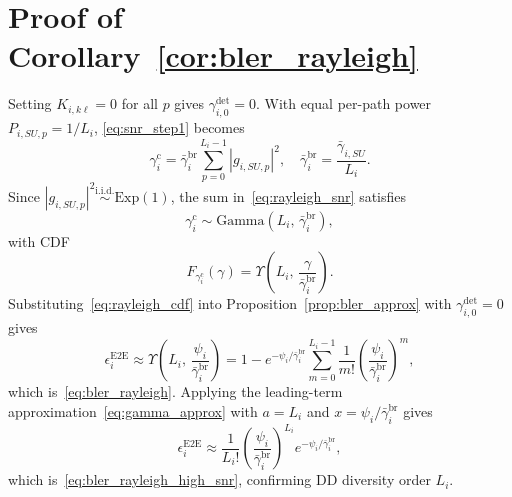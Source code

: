 \documentclass[lettersize,journal]{IEEEtran}
\begin{document}
\section{Proof of Corollary~\ref{cor:bler_rayleigh}}
\label{app:proof_bler_rayleigh}
Setting $K_{i,k\ell}=0$ for all $p$ gives $\gamma_{i,0}^{\mathrm{det}}=0$. With equal per-path power $P_{i,SU,p}=1/L_i$, \eqref{eq:snr_step1} becomes
\begin{equation}
\gamma_i^{\mathrm{c}}=\bar{\gamma}_{i}^{\mathrm{br}}\sum_{p=0}^{L_i-1}|g_{i,SU,p}|^2,\quad\bar{\gamma}_{i}^{\mathrm{br}}=\frac{\bar{\gamma}_{i,SU}}{L_i}.
\label{eq:rayleigh_snr}
\end{equation}
Since $|g_{i,SU,p}|^2\overset{\mathrm{i.i.d.}}{\sim}\mathrm{Exp}(1)$, the sum in~\eqref{eq:rayleigh_snr} satisfies
\begin{equation}
\gamma_i^{\mathrm{c}}\sim\mathrm{Gamma}\!\left(L_i,\,\bar{\gamma}_{i}^{\mathrm{br}}\right),
\end{equation}
with CDF
\begin{equation}
F_{\gamma_i^{\mathrm{c}}}(\gamma)=\Upsilon\!\left(L_i,\,\frac{\gamma}{\bar{\gamma}_{i}^{\mathrm{br}}}\right).
\label{eq:rayleigh_cdf}
\end{equation}
Substituting~\eqref{eq:rayleigh_cdf} into Proposition~\ref{prop:bler_approx} with $\gamma_{i,0}^{\mathrm{det}}=0$ gives
\begin{equation}
\epsilon_i^{\mathrm{E2E}}\approx\Upsilon\!\left(L_i,\,\frac{\psi_i}{\bar{\gamma}_{i}^{\mathrm{br}}}\right)=1-e^{-\psi_i/\bar{\gamma}_{i}^{\mathrm{br}}}\sum_{m=0}^{L_i-1}\frac{1}{m!}\left(\frac{\psi_i}{\bar{\gamma}_{i}^{\mathrm{br}}}\right)^{\!m},
\end{equation}
which is~\eqref{eq:bler_rayleigh}. Applying the leading-term approximation~\eqref{eq:gamma_approx} with $a=L_i$ and $x=\psi_i/\bar{\gamma}_{i}^{\mathrm{br}}$ gives
\begin{equation}
\epsilon_i^{\mathrm{E2E}}\approx\frac{1}{L_i!}\left(\frac{\psi_i}{\bar{\gamma}_{i}^{\mathrm{br}}}\right)^{\!L_i}e^{-\psi_i/\bar{\gamma}_{i}^{\mathrm{br}}},
\end{equation}
which is~\eqref{eq:bler_rayleigh_high_snr}, confirming DD diversity order $L_i$.
\end{document}
